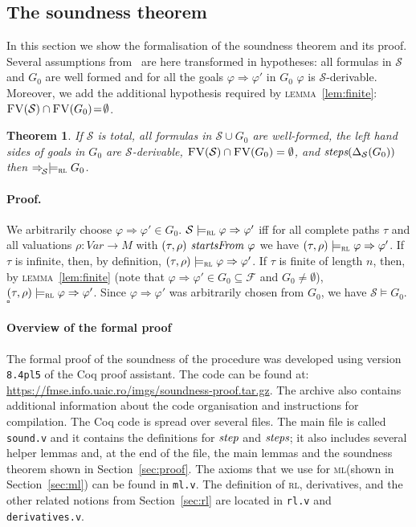 \documentclass[conference]{IEEEtran}
\newcommand{\M}{\mathit{M}}
\newcommand{\F}{\mathcal{F}}
\renewcommand{\S}{\mathcal{S}}
\newcommand{\tran}[2]{\Ra^{\!#1}_{\!#2}}
\newcommand{\Ra}{\Rightarrow}
\newcommand{\Var}{\mathit{Var}}
\newcommand{\FreeVars}{\mathit{\textsc{FV}}}
\newcommand{\ML}{\textsc{ml}\xspace}
\newcommand{\RL}{\textsc{rl}\xspace}
\newcommand{\rrule}[2]{{#1} \Ra{#2}}
\newcommand{\modelsrl}{\models_\RL}
\newcommand{\coq}[1]{{\small \textit{#1}}}
\newtheorem{theorem}{Theorem}
\begin{document}
\subsection{The soundness theorem}
\label{sec:th}

In this section we show the formalisation of the soundness theorem and its proof.
Several assumptions from~\cite{lucanu-rusu-arusoaie-nowak-LRC2015} are here transformed in hypotheses: all formulas in $\S$ and $G_0$ are well formed and for all the goals $\rrule{\varphi}{\varphi'}$ in $G_0$  $\varphi$ is $\S$-derivable.
Moreover, we add the additional hypothesis required by \textsc{lemma}~\ref{lem:finite}: $\FreeVars(\S)\cap\FreeVars(G_0) \!=\!\emptyset$.
\begin{theorem}
If $\S$ is total, all formulas in $\S\cup G_0$ are well-formed, the left hand sides of goals in $G_0$ are $\S$-derivable, $\FreeVars(\S)\cap\FreeVars(G_0) = \emptyset$, and $\coq{steps}(\Delta_\S(G_0))$ then $\tran{}{\S} \modelsrl G_0$.
\end{theorem}

\paragraph{Proof.}
We arbitrarily choose $\rrule{\varphi}{\varphi'} \in G_0$.
$\S\modelsrl \rrule{\varphi}{\varphi'}$  iff for all complete paths $\tau$ and all valuations $\rho:\Var\to\M$ with $(\tau, \rho) \coq{ startsFrom } \varphi$ we have $(\tau, \rho)\modelsrl\rrule{\varphi}{\varphi'}$.
If $\tau$ is infinite, then, by definition, $(\tau, \rho)\modelsrl\rrule{\varphi}{\varphi'}$.
If $\tau$ is finite of length $n$, then, by \textsc{lemma}~\ref{lem:finite} (note that $\rrule{\varphi}{\varphi'} \in G_0 \subseteq \F$ and $G_0 \neq \emptyset$), $(\tau, \rho)\modelsrl\rrule{\varphi}{\varphi'}$. 
Since $\rrule{\varphi}{\varphi'}$ was arbitrarily chosen from  $G_0$, we have $\S \models G_0$.
\hfill$\square$


\paragraph{Overview of the formal proof}
The formal proof of the soundness of the procedure was developed using version {\tt 8.4pl5} of the Coq proof assistant.
The code can be found at: \url{https://fmse.info.uaic.ro/imgs/soundness-proof.tar.gz}.
The archive also contains additional information about the code organisation and instructions for compilation.
The Coq code is spread over several files.
The main file is called {\tt sound.v} and it contains the definitions for $\coq{step}$ and $\coq{steps}$; it also includes several helper lemmas and, at the end of the file, the main lemmas and the soundness theorem shown in Section~\ref{sec:proof}.
The axioms that we use for \ML (shown in Section~\ref{sec:ml}) can be found in {\tt ml.v}. 
The definition of \RL, derivatives, and the other related notions from Section~\ref{sec:rl} are located in {\tt rl.v} and {\tt derivatives.v}.
\end{document}
